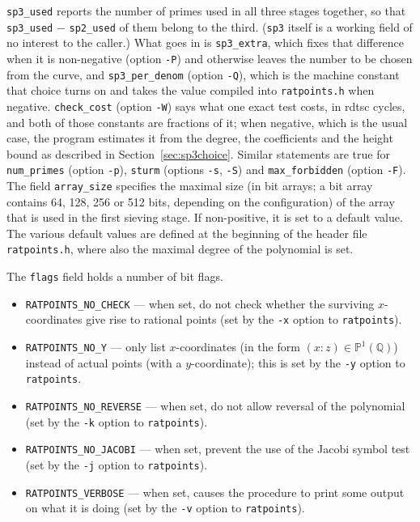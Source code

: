\documentclass[12pt,a4paper,oneside]{amsart}
\newcommand{\Q}{{\mathbb Q}}
\newcommand{\BP}{{\mathbb P}}
\begin{document}
\texttt{sp3\_used}
reports the number of primes used in all three stages together, so that
\texttt{sp3\_used} $-$ \texttt{sp2\_used} of them belong to the third.
(\texttt{sp3} itself is a working field of no interest to the caller.)
What goes in is \texttt{sp3\_extra}, which fixes that difference when
it is non-negative (option \verb+-P+) and otherwise leaves the number to be
chosen from the curve, and \texttt{sp3\_per\_denom} (option \verb+-Q+),
which is the machine constant that choice turns on and takes the value
compiled into \texttt{ratpoints.h} when negative. \texttt{check\_cost}
(option \verb+-W+) says what one exact test costs, in rdtsc cycles, and both
of those constants are fractions of it; when negative, which is the usual
case, the program estimates it from the degree, the coefficients and the
height bound as described in Section~\ref{sec:sp3choice}.
Similar statements are true for
\texttt{num\_primes} (option \verb+-p+), \texttt{sturm} (options \verb+-s+,
\verb+-S+) and \texttt{max\_forbidden} (option \verb+-F+). The field
\texttt{array\_size} specifies the maximal size (in bit arrays; a bit array
contains 64, 128, 256 or 512 bits, depending on the configuration) of the
array that is used in the first sieving stage. If non-positive, it is
set to a default value. The various default values are defined at the
beginning of the header file \texttt{ratpoints.h}, where also the maximal
degree of the polynomial is set.

The \texttt{flags} field holds a number of bit flags.
\begin{itemize}
  \item \texttt{RATPOINTS\_NO\_CHECK} --- when set, do not check whether
        the surviving $x$-coordinates give rise to rational points
        (set by the \verb+-x+ option to \texttt{ratpoints}).
  \item \texttt{RATPOINTS\_NO\_Y} --- only list $x$-coordinates (in the
        form $(x : z) \in \BP^1(\Q)$) instead of actual points (with
        a $y$-coordinate); this is set by the \verb+-y+ option to
        \texttt{ratpoints}.
  \item \texttt{RATPOINTS\_NO\_REVERSE} --- when set, do not allow reversal
        of the polynomial (set by the \verb+-k+ option to \texttt{ratpoints}).
  \item \texttt{RATPOINTS\_NO\_JACOBI} --- when set, prevent the use of the
        Jacobi symbol test (set by the \verb+-j+ option to \texttt{ratpoints}).
  \item \texttt{RATPOINTS\_VERBOSE} --- when set, causes the procedure to
        print some output on what it is doing (set by the \verb+-v+ option
        to \texttt{ratpoints}).
\end{itemize}
\end{document}
